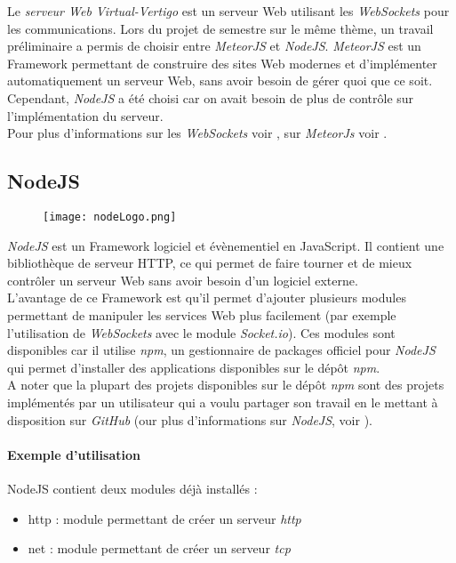 Le \textit{serveur Web Virtual-Vertigo} est un serveur Web utilisant les \textit{WebSockets} pour les communications. Lors du projet de semestre sur le même thème, un travail préliminaire a permis de choisir entre \textit{MeteorJS} et \textit{NodeJS}. \textit{MeteorJS} est un \textsf{Framework} permettant de construire des sites Web modernes et d'implémenter automatiquement un serveur Web, sans avoir besoin de gérer quoi que ce soit. Cependant, \textit{NodeJS} a été choisi car on avait besoin de plus de contrôle sur l'implémentation du serveur.\\
Pour plus d'informations sur les \textit{WebSockets} voir \cite{websocket}, sur \textit{MeteorJs} voir \cite{MeteorJS}.

\subsection{NodeJS}
\begin{figure}[H]
	\flushright
   		\texttt{[image: nodeLogo.png]}
\end{figure}
\textit{NodeJS} est un \textsf{Framework} logiciel et évènementiel en \textsf{JavaScript}. Il contient une bibliothèque de serveur HTTP, ce qui permet de faire tourner et de mieux contrôler un serveur Web sans avoir besoin d'un logiciel externe. \\
L'avantage de ce \textsf{Framework} est qu'il permet d'ajouter plusieurs modules permettant de manipuler les services Web plus facilement (par exemple l'utilisation de \textit{WebSockets} avec le module \textit{Socket.io}). Ces modules sont disponibles car il utilise \textit{npm}, un gestionnaire de \textsf{packages} officiel pour \textit{NodeJS} qui permet d'installer des applications disponibles sur le dépôt \textit{npm}. \\
A noter que la plupart des projets disponibles sur le dépôt \textit{npm} sont des projets implémentés par un utilisateur qui a voulu partager son travail en le mettant à disposition sur \textit{GitHub} (our plus d'informations sur \textit{NodeJS}, voir \cite{NodeJS}).

\paragraph{Exemple d'utilisation \\}
NodeJS contient deux modules déjà installés :
\begin{itemize}
\item http : module permettant de créer un serveur \textit{http}
\item net : module permettant de créer un serveur \textit{tcp\\}

\end{itemize}

